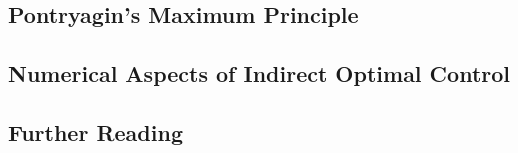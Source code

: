 \subsection{Pontryagin's Maximum Principle}



\subsection{Numerical Aspects of Indirect Optimal Control}



\subsection{Further Reading}